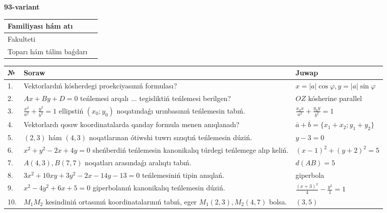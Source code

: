 \documentclass{article}
\begin{document}
\egroup

\newpage


\textbf{93-variant}\\

\bgroup
\def\arraystretch{1.6} %

\begin{tabular}{|m{5.7cm}|m{9.5cm}|}
\hline
Familiyası hám atı & \\
\hline
Fakulteti  & \\
\hline
Toparı hám tálim baǵdarı  & \\
\hline
\end{tabular}

\vspace{1cm}

\begin{tabular}{|m{0.7cm}|m{10cm}|m{4cm}|}
\hline
№ & Soraw & Juwap \\
\hline
1. & Vektorlardıń kósherdegi proekciyasınıń formulası? & $x=|a|\cos\varphi, y=|a|\sin\varphi$ \\
\hline
2. & $Ax+By+D=0$ teńlemesi arqalı ... tegisliktiń teńlemesi berilgen? & $OZ$ kósherine parallel \\
\hline
3. & $\frac{x^2}{a^2}+\frac{y^2}{b^2}=1$ ellipstiń $(x_0;y_0)$ noqatındaǵı urınbasınıń teńlemesin tabıń. & $\frac{x_0x}{a^2}+\frac{y_0y}{b^2}=1$ \\
\hline
4. & Vektorlardı qosıw koordinatalarda qanday formula menen anıqlanadı? & $\overline{a}+\overline{b}=\{x_1+x_2;y_1+y_2\}$ \\
\hline
5. & $(2, 3)$ hám $(4, 3)$ noqatlarınan ótiwshi tuwrı sızıqtıń teńlemesin dúziń. & $ y-3=0$ \\
\hline
6. & $x^{2}+y^{2}-2x+4y=0$ sheńberdiń teńlemesin kanonikalıq túrdegi teńlemege alıp keliń. & $(x-1)^{2}+(y+2)^{2}=5$ \\
\hline
7. & $A(4, 3), B(7, 7)$ noqatları arasındaǵı aralıqtı tabıń. & $d(AB)=5$ \\
\hline
8. & $3x^{2}+10xy+3y^{2}-2x-14y-13=0$ teńlemesiniń tipin anıqlań. & giperbola \\
\hline
9. & $x^{2}-4y^{2}+6x+5=0$ giperbolanıń kanonikalıq teńlemesin dúziń. & $\frac{(x+3)^{2}}{4}-\frac{y^{2}}{1}=1$ \\
\hline
10. & $M_{1}M_{2}$ kesindiniń ortasınıń koordinatalarınıń tabıń, eger $M_{1} (2, 3), M_{2} (4, 7)$ bolsa. & $(3,5)$ \\
\hline
\end{tabular}
\end{document}
